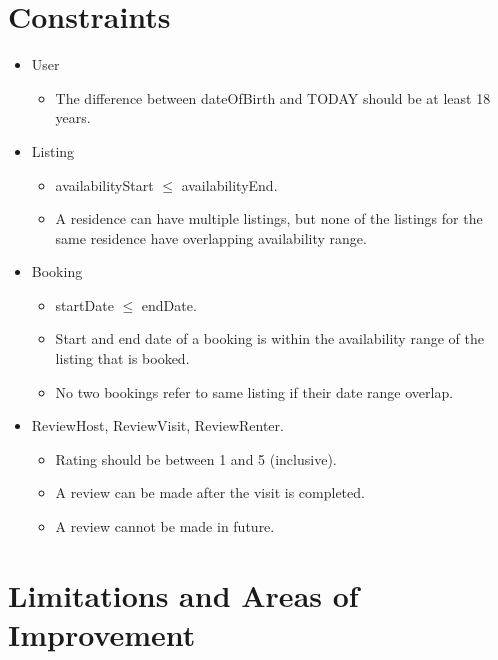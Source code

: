 \documentclass[11pt]{article}
\begin{document}
\section*{Constraints}
\begin{itemize}
  \item User
  \begin{itemize}
    \item The difference between dateOfBirth and TODAY should be at least 18 years.
  \end{itemize}
  \item Listing
  \begin{itemize}
    \item availabilityStart $\leq$ availabilityEnd.
    \item A residence can have multiple listings, but none of the listings for the same residence have overlapping availability range.
  \end{itemize}
  \item Booking
  \begin{itemize}
    \item startDate $\leq$ endDate.
    \item Start and end date of a booking is within the availability range of the listing that is booked.
    \item No two bookings refer to same listing if their date range overlap.
  \end{itemize}
  \item ReviewHost, ReviewVisit, ReviewRenter.
  \begin{itemize}
    \item Rating should be between 1 and 5 (inclusive).
    \item A review can be made after the visit is completed.
    \item A review cannot be made in future.
  \end{itemize}
\end{itemize}


\newpage

\section*{Limitations and Areas of Improvement}
\end{document}
